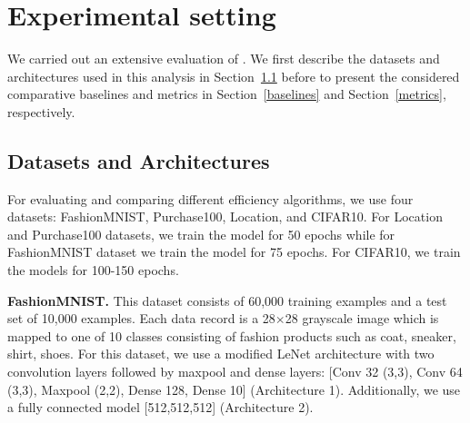 \section{Experimental setting}
\label{setting}

We carried out an extensive evaluation of \method. %
%
We first describe the datasets and architectures used in this analysis in Section~\ref{datasets} before to present the considered comparative baselines and metrics in Section~\ref{baselines} and Section~\ref{metrics}, respectively. %


\subsection{Datasets and Architectures}
\label{datasets}

For evaluating and comparing different efficiency algorithms, we use four datasets: FashionMNIST, Purchase100, Location, and CIFAR10.
For Location and Purchase100 datasets, we train the model for 50 epochs while for FashionMNIST dataset we train the model for 75 epochs.
For CIFAR10, we train the models for 100-150 epochs.

\noindent\textbf{FashionMNIST.} This dataset consists of 60,000 training examples and a test set of 10,000 examples.
Each data record is a 28$\times$28 grayscale image which is mapped to one of 10 classes consisting of fashion products such as coat, sneaker, shirt, shoes.
For this dataset, we use a modified LeNet architecture with two convolution layers followed by maxpool and dense layers: [Conv 32 (3,3), Conv 64 (3,3), Maxpool (2,2), Dense 128, Dense 10] (Architecture 1). Additionally, we use a fully connected model [512,512,512] (Architecture 2).


